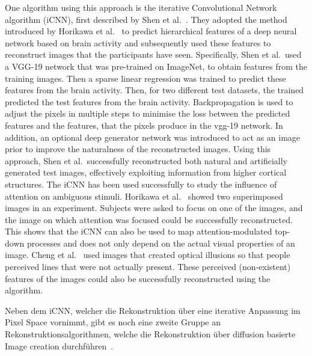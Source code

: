 One algorithm using this approach is the iterative Convolutional Network algorithm (iCNN), first described by Shen et al.~\cite{shenDeepImageReconstruction2019}. They adopted the method introduced by Horikawa et al.~\cite{horikawaGenericDecodingSeen2017} to predict hierarchical features of a deep neural network based on brain activity and subsequently used these features to reconstruct images that the participants have seen. Specifically, Shen et al.\ used a VGG-19 network that was pre-trained on ImageNet, to obtain features from the training images. Then a sparse linear regression was trained to predict these features from the brain activity. Then, for two different test datasets, the trained  predicted the test features from the brain activity. Backpropagation is used to adjust the pixels in multiple steps to minimise the loss between the predicted features and the features, that the pixels produce in the vgg-19 network. In addition, an optional deep generator network was introduced to act as an image prior to improve the naturalness of the reconstructed images. Using this approach, Shen et al.\ successfully reconstructed both natural and artificially generated test images, effectively exploiting information from higher cortical structures. The iCNN has been used successfully to study the influence of attention on ambiguous stimuli. Horikawa et al.~\cite{horikawaAttentionModulatesNeural2022} showed two superimposed images in an experiment. Subjects were asked to focus on one of the images, and the image on which attention was focused could be successfully reconstructed. This shows that the iCNN can also be used to map attention-modulated top-down processes and does not only depend on the actual visual properties of an image. Cheng et al.~\cite{chengReconstructingVisualIllusory2023} used images that created optical illusions so that people perceived lines that were not actually present. These perceived (non-existent) features of the images could also be successfully reconstructed using the algorithm.



Neben dem iCNN, welcher die Rekonstruktion über eine iterative Anpassung im Pixel Space vornimmt, gibt es noch eine zweite Gruppe an Rekonstruktionsalgorithmen, welche die Rekonstruktion über diffusion basierte Image creation durchführen~\cite{takagiHighResolutionImageReconstruction,ozcelikNaturalSceneReconstruction2023, scottiMindEye2SharedSubjectModels2024}. 



